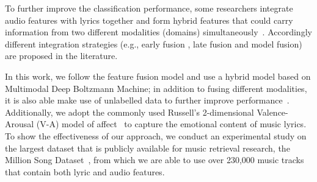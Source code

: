 \documentclass{llncs}
\begin{document}
To further improve the classification performance, some researchers integrate audio features with lyrics together and form hybrid features that could carry information from two different modalities (domains) simultaneously~\cite{DBLP:conf/ismir/HuDE09}. Accordingly different integration strategies (e.g., early fusion \cite{DBLP:conf/ismir/HuD10}, late fusion\cite{DBLP:conf/icmla/LaurierGH08} and model fusion\cite{DBLP:conf/mmm/XueXS15}) are proposed in the literature. %

In this work, we follow the feature fusion model and use a hybrid model based on Multimodal Deep Boltzmann Machine; in addition to fusing different modalities, it is also able make use of unlabelled data to further improve performance~\cite{DBLP:journals/jmlr/SrivastavaS14}. Additionally, we adopt the commonly used Russell's 2-dimensional Valence-Arousal (V-A) model of affect~\cite{Russell1980} to capture the emotional content of music lyrics. To show the effectiveness of our approach, we conduct an experimental study on the largest dataset that is publicly available for music retrieval research, the Million Song Dataset~\cite{DBLP:conf/ismir/Bertin-MahieuxEWL11}, from which we are able to use over 230,000 music tracks that contain both lyric and audio features.  %
\end{document}
